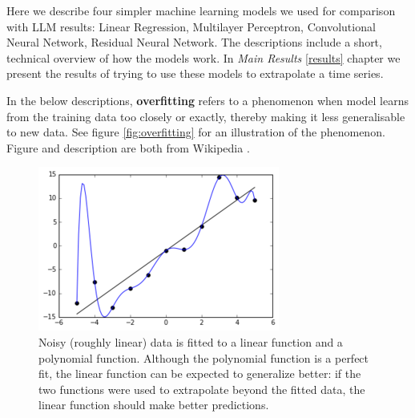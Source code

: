 Here we describe four simpler machine learning models we used for comparison with LLM results: Linear Regression, Multilayer Perceptron, Convolutional Neural Network, Residual Neural Network. The descriptions include a short, technical overview of how the models work. In \emph{Main Results} \autoref{results} chapter we present the results of trying to use these models to extrapolate a time series.

In the below descriptions, \textbf{overfitting} refers to a phenomenon when model learns from the training data too closely or exactly, thereby making it less generalisable to new data. See  figure  \autoref{fig:overfitting} for an illustration of the phenomenon. Figure and description are both from Wikipedia \cite{overfitting}.
\begin{figure}[h!]
	\centering
	\includegraphics[width=0.5\linewidth]{"pictures/overfitted_data.png"}
	\caption{Noisy (roughly linear) data is fitted to a linear function and a polynomial function. Although the polynomial function is a perfect fit, the linear function can be expected to generalize better: if the two functions were used to extrapolate beyond the fitted data, the linear function should make better predictions.}
	\label{fig:overfitting}
\end{figure}
